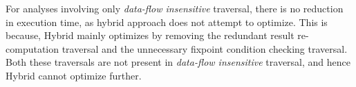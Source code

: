 For analyses involving only 
\textit{data-flow insensitive} traversal, there is no reduction in execution time, as 
hybrid approach does not attempt to optimize. This is because, Hybrid mainly optimizes by removing the redundant result re-computation traversal and the
unnecessary fixpoint condition checking traversal. Both these traversals are not present in \textit{data-flow insensitive} traversal, and hence Hybrid cannot optimize further.


%
%
%
